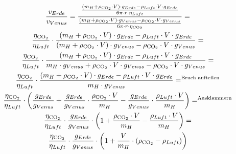 \documentclass{article}
\begin{document}
        \begin{equation}
            \begin{gathered} \label{eq:geschwindigkeiten_verhältnis}
                \frac{ v_{Erde} }{ v_{Venus} } = 
                \frac{ 
                    \frac{ \left( m_H + \rho_{\ce{CO2}} \cdot V \right) \cdot g_{Erde} - \rho_{Luft} \cdot V \cdot g_{Erde} }{ 6 \pi \cdot r \cdot \eta_{Luft} } }{ 
                    \frac{ \left( m_H + \rho_{\ce{CO2}} \cdot V \right) \cdot g_{Venus} - \rho_{\ce{CO2}} \cdot V \cdot g_{Venus} }{ 6 \pi \cdot r \cdot \eta_{\ce{CO2}} } 
                } = \\
                \frac{ \eta_{\ce{CO2}}}{ \eta_{Luft} } \cdot
                \frac{ 
                    \left( m_H + \rho_{\ce{CO2}} \cdot V \right) \cdot g_{Erde} - \rho_{Luft} \cdot V \cdot g_{Erde} }{
                    \left( m_H + \rho_{\ce{CO2}} \cdot V \right) \cdot g_{Venus} - \rho_{\ce{CO2}} \cdot V \cdot g_{Venus}
                } = \\
                \frac{ \eta_{\ce{CO2}}}{ \eta_{Luft} } \cdot
                \frac{
                    \left( m_H + \rho_{\ce{CO2}} \cdot V \right) \cdot g_{Erde} - \rho_{Luft} \cdot V \cdot g_{Erde} }{
                    m_H \cdot g_{Venus} + \rho_{\ce{CO2}} \cdot V \cdot g_{Venus} - \rho_{\ce{CO2}} \cdot V \cdot g_{Venus}
                } = \\
                \frac{ \eta_{\ce{CO2}}}{ \eta_{Luft} } \cdot
                \frac{
                    \left( m_H + \rho_{\ce{CO2}} \cdot V \right) \cdot g_{Erde} - \rho_{Luft} \cdot V \cdot g_{Erde} }{
                    m_H \cdot g_{Venus}
                } =^{\text{Bruch aufteilen}} \\
                \frac{ \eta_{\ce{CO2}}}{ \eta_{Luft} } \cdot
                \left( 
                    \frac{ g_{Erde} }{ g_{Venus} } + 
                    \frac{ g_{Erde} }{ g_{Venus} } \cdot \frac{ \rho_{\ce{CO2}} \cdot V }{m_H} -
                    \frac{ g_{Erde} }{ g_{Venus} } \cdot \frac{ \rho_{Luft} \cdot V }{ m_H }
                \right) =^{\text{Ausklammern}} \\
                \frac{ \eta_{\ce{CO2}}}{ \eta_{Luft} } \cdot \frac{ g_{Erde} }{ g_{Venus} } \cdot
                \left( 1 + \frac{ \rho_{\ce{CO2}} \cdot V }{m_H} - \frac{ \rho_{Luft} \cdot V }{ m_H } \right) = \\
                \frac{ \eta_{\ce{CO2}}}{ \eta_{Luft} } \cdot \frac{ g_{Erde} }{ g_{Venus} } \cdot
                \left( 1 + \frac{V}{m_H} \cdot \left( \rho_{\ce{CO2}} - \rho_{Luft} \right) \right)
            \end{gathered}
        \end{equation}
\end{document}
